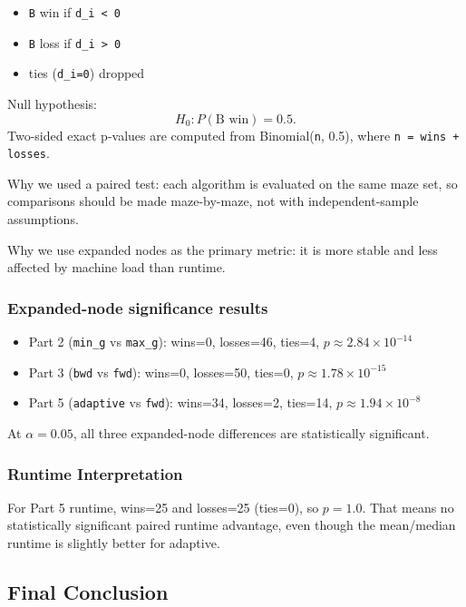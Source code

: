 \documentclass[11pt]{article}
\begin{document}
\begin{itemize}[leftmargin=*]
\item \texttt{B} win if \texttt{d\_i < 0}
\item \texttt{B} loss if \texttt{d\_i > 0}
\item ties (\texttt{d\_i=0}) dropped
\end{itemize}

Null hypothesis:
\[
H_0: P(\text{B win}) = 0.5.
\]
Two-sided exact p-values are computed from Binomial(\texttt{n}, 0.5), where \texttt{n = wins + losses}.

Why we used a paired test: each algorithm is evaluated on the same maze set, so comparisons should be made maze-by-maze, not with independent-sample assumptions.

Why we use expanded nodes as the primary metric: it is more stable and less affected by machine load than runtime.

\subsubsection*{Expanded-node significance results}

\begin{itemize}[leftmargin=*]
\item Part 2 (\texttt{min\_g} vs \texttt{max\_g}): wins=0, losses=46, ties=4, \(p \approx 2.84 \times 10^{-14}\)
\item Part 3 (\texttt{bwd} vs \texttt{fwd}): wins=0, losses=50, ties=0, \(p \approx 1.78 \times 10^{-15}\)
\item Part 5 (\texttt{adaptive} vs \texttt{fwd}): wins=34, losses=2, ties=14, \(p \approx 1.94 \times 10^{-8}\)
\end{itemize}

At \(\alpha=0.05\), all three expanded-node differences are statistically significant.

\subsubsection*{Runtime Interpretation}

For Part 5 runtime, wins=25 and losses=25 (ties=0), so \(p=1.0\).  
That means no statistically significant paired runtime advantage, even though the mean/median runtime is slightly better for adaptive.

\subsection*{Final Conclusion}
\end{document}
